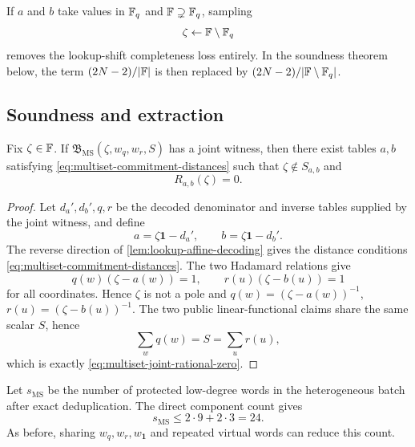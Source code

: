 \begin{remark}
\label{rem:multiset-extension-challenge}
If $a$ and $b$ take values in $\mathbb{F}_q$ and $\mathbb{F}\supsetneq\mathbb{F}_q$, sampling
\[
  \zeta\leftarrow\mathbb{F}\setminus\mathbb{F}_q
\]
removes the lookup-shift completeness loss entirely.  In the soundness theorem below, the term $(2N-2)/|\mathbb{F}|$ is then replaced by $(2N-2)/|\mathbb{F}\setminus\mathbb{F}_q|$.
\end{remark}

\subsection{Soundness and extraction}
\label{sec:multiset-soundness}

\begin{lemma}
\label{lem:multiset-joint-witness}
Fix $\zeta\in\mathbb{F}$.  If $\mathfrak B_{\mathrm{MS}}(\zeta,w_q,w_r,S)$ has a joint witness, then there exist tables $a,b$ satisfying \eqref{eq:multiset-commitment-distances} such that $\zeta\notin S_{a,b}$ and
\begin{equation}
  R_{a,b}(\zeta)=0.
  \label{eq:multiset-joint-rational-zero}
\end{equation}
\end{lemma}

\begin{proof}
Let $d_a',d_b',q,r$ be the decoded denominator and inverse tables supplied by the joint witness, and define
\[
  a=\zeta\mathbf1-d_a',
  \qquad
  b=\zeta\mathbf1-d_b'.
\]
The reverse direction of \cref{lem:lookup-affine-decoding} gives the distance conditions \eqref{eq:multiset-commitment-distances}.  The two Hadamard relations give
\[
  q(w)(\zeta-a(w))=1,
  \qquad
  r(u)(\zeta-b(u))=1
\]
for all coordinates.  Hence $\zeta$ is not a pole and $q(w)=(\zeta-a(w))^{-1}$, $r(u)=(\zeta-b(u))^{-1}$.  The two public linear-functional claims share the same scalar $S$, hence
\[
  \sum_wq(w)=S=\sum_ur(u),
\]
which is exactly \eqref{eq:multiset-joint-rational-zero}.
\end{proof}

Let $s_{\mathrm{MS}}$ be the number of protected low-degree words in the heterogeneous batch after exact deduplication.  The direct component count gives
\begin{equation}
  s_{\mathrm{MS}}\le2\cdot9+2\cdot3=24.
  \label{eq:multiset-protected-count}
\end{equation}
As before, sharing $w_q,w_r,w_{\mathbf1}$ and repeated virtual words can reduce this count.


